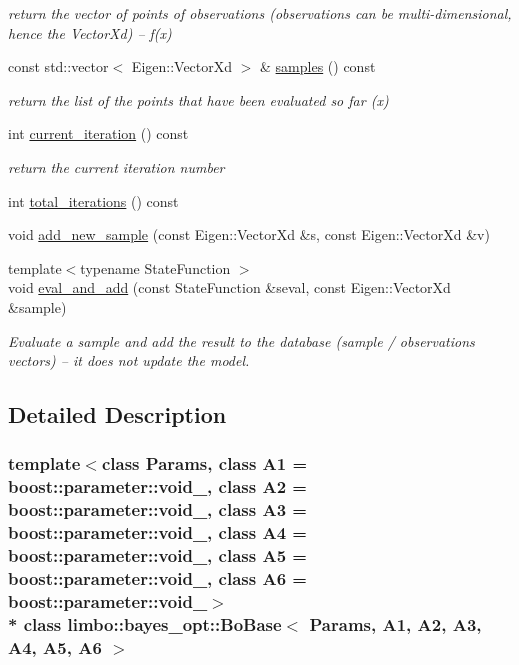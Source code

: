 \begin{DoxyCompactItemize}
\begin{DoxyCompactList}\small\item\em return the vector of points of observations (observations can be multi-\/dimensional, hence the Vector\+Xd) -- f(x) \end{DoxyCompactList}\item 
const std\+::vector$<$ Eigen\+::\+Vector\+Xd $>$ \& \hyperlink{classlimbo_1_1bayes__opt_1_1_bo_base_ad3ba0dba1418df0ed8e79d4dd3cc907a}{samples} () const 
\begin{DoxyCompactList}\small\item\em return the list of the points that have been evaluated so far (x) \end{DoxyCompactList}\item 
int \hyperlink{classlimbo_1_1bayes__opt_1_1_bo_base_ac3d643d5a668edf22ad053bfc54ea090}{current\+\_\+iteration} () const 
\begin{DoxyCompactList}\small\item\em return the current iteration number \end{DoxyCompactList}\item 
int \hyperlink{classlimbo_1_1bayes__opt_1_1_bo_base_a5470e106c4584a30636cafb6fbad6d73}{total\+\_\+iterations} () const 
\item 
void \hyperlink{classlimbo_1_1bayes__opt_1_1_bo_base_ac533d6397b0c0fa5ba0a4d03e0545fa2}{add\+\_\+new\+\_\+sample} (const Eigen\+::\+Vector\+Xd \&s, const Eigen\+::\+Vector\+Xd \&v)
\item 
{\footnotesize template$<$typename State\+Function $>$ }\\void \hyperlink{classlimbo_1_1bayes__opt_1_1_bo_base_a70e8e4fea1b56aedc943fe62170659e4}{eval\+\_\+and\+\_\+add} (const State\+Function \&seval, const Eigen\+::\+Vector\+Xd \&sample)
\begin{DoxyCompactList}\small\item\em Evaluate a sample and add the result to the \textquotesingle{}database\textquotesingle{} (sample / observations vectors) -- it does not update the model. \end{DoxyCompactList}\end{DoxyCompactItemize}


\subsection{Detailed Description}
\subsubsection*{template$<$class Params, class A1 = boost\+::parameter\+::void\+\_\+, class A2 = boost\+::parameter\+::void\+\_\+, class A3 = boost\+::parameter\+::void\+\_\+, class A4 = boost\+::parameter\+::void\+\_\+, class A5 = boost\+::parameter\+::void\+\_\+, class A6 = boost\+::parameter\+::void\+\_\+$>$\\*
class limbo\+::bayes\+\_\+opt\+::\+Bo\+Base$<$ Params, A1, A2, A3, A4, A5, A6 $>$}

